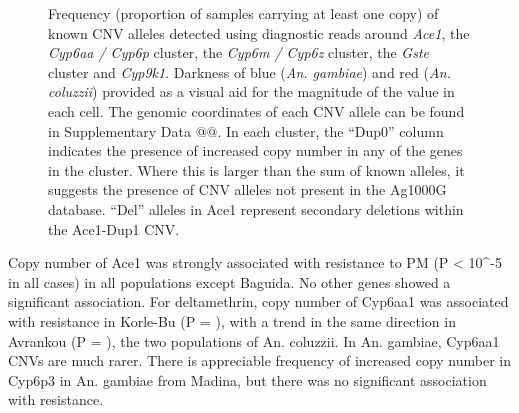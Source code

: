 \documentclass[a4paper,12pt]{article}
\begin{document}
\begin{figure}[h]
\begin{center}
		\vskip 0.4cm
	\end{center}
	\caption{\footnotesize Frequency (proportion of samples carrying at least one copy) of known CNV alleles detected using diagnostic reads around \textit{Ace1}, the \textit{Cyp6aa / Cyp6p} cluster, the \textit{Cyp6m / Cyp6z} cluster, the \textit{Gste} cluster and \textit{Cyp9k1}. Darkness of blue (\textit{An. gambiae}) and red (\textit{An. coluzzii}) provided as a visual aid for the magnitude of the value in each cell. The genomic coordinates of each CNV allele can be found in Supplementary Data @@. In each cluster, the ``Dup0'' column indicates the presence of increased copy number in any of the genes in the cluster. Where this is larger than the sum of known alleles, it suggests the presence of CNV alleles not present in the Ag1000G database. ``Del'' alleles in Ace1 represent secondary deletions within the Ace1-Dup1 CNV.}
	\label{FigS1}
\end{figure}

\clearpage

Copy number of Ace1 was strongly associated with resistance to PM (P < 10^-5 in all cases) in all populations except Baguida. No other genes showed a significant association. For deltamethrin, copy number of Cyp6aa1 was associated with resistance in Korle-Bu (P = ), with a trend in the same direction in Avrankou (P = ), the two populations of An. coluzzii. In An. gambiae, Cyp6aa1 CNVs are much rarer. There is appreciable frequency of increased copy number in Cyp6p3 in An. gambiae from Madina, but there was no significant association with resistance. 
\end{document}
